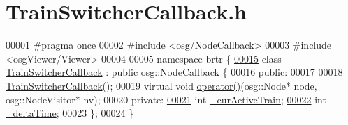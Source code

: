 \hypertarget{_train_switcher_callback_8h_source}{\section{Train\+Switcher\+Callback.\+h}
\label{_train_switcher_callback_8h_source}
}

\begin{DoxyCode}
00001 \textcolor{preprocessor}{#pragma once}
00002 \textcolor{preprocessor}{#include <osg/NodeCallback>}
00003 \textcolor{preprocessor}{#include <osgViewer/Viewer>}
00004 
00005 \textcolor{keyword}{namespace }brtr \{
\hypertarget{_train_switcher_callback_8h_source_l00015}{}\hyperlink{classbrtr_1_1_train_switcher_callback}{00015}     \textcolor{keyword}{class }\hyperlink{classbrtr_1_1_train_switcher_callback}{TrainSwitcherCallback} : \textcolor{keyword}{public} osg::NodeCallback \{
00016     \textcolor{keyword}{public}:
00017 
00018         \hyperlink{classbrtr_1_1_train_switcher_callback_a54ad53b07976bf34af2a0e6061088f3c}{TrainSwitcherCallback}();
00019         \textcolor{keyword}{virtual} \textcolor{keywordtype}{void} \hyperlink{classbrtr_1_1_train_switcher_callback_a5a8182c650febc07a8443f6a35c32087}{operator()}(osg::Node* node, osg::NodeVisitor* nv);
00020     \textcolor{keyword}{private}:
\hypertarget{_train_switcher_callback_8h_source_l00021}{}\hyperlink{classbrtr_1_1_train_switcher_callback_ac87e64555ad379814a93220447c49257}{00021}         \textcolor{keywordtype}{int} \hyperlink{classbrtr_1_1_train_switcher_callback_ac87e64555ad379814a93220447c49257}{\_curActiveTrain};
\hypertarget{_train_switcher_callback_8h_source_l00022}{}\hyperlink{classbrtr_1_1_train_switcher_callback_a1d2fbe75d19ca03cba449cdf4277f0eb}{00022}         \textcolor{keywordtype}{int} \hyperlink{classbrtr_1_1_train_switcher_callback_a1d2fbe75d19ca03cba449cdf4277f0eb}{\_deltaTime};
00023     \};
00024 \}
\end{DoxyCode}
